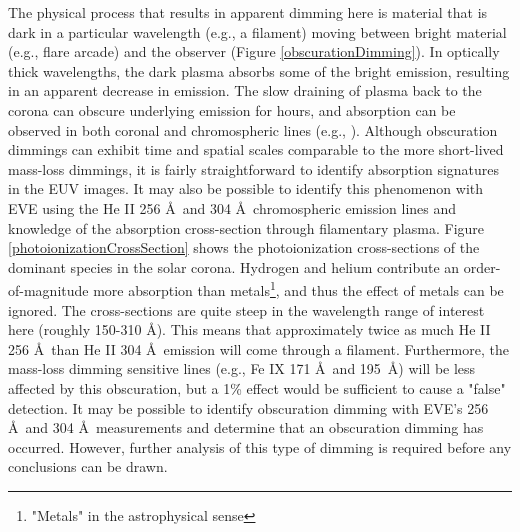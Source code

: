 The physical process that results in apparent dimming here is material that is dark in a particular wavelength (e.g., a filament) moving between bright material (e.g., flare arcade) and the observer (Figure \ref{obscurationDimming}). In optically thick wavelengths, the dark plasma absorbs some of the bright emission, resulting in an apparent decrease in emission. The slow draining of plasma back to the corona can obscure underlying emission for hours, and absorption can be observed in both coronal and chromospheric lines (e.g., \citealt{Gilbert2013}). Although obscuration dimmings can exhibit time and spatial scales comparable to the more short-lived mass-loss dimmings, it is fairly straightforward to identify absorption signatures in the EUV images. It may also be possible to identify this phenomenon with EVE using the He II 256 \AA\ and 304 \AA\ chromospheric emission lines and knowledge of the absorption cross-section through filamentary plasma. Figure \ref{photoionizationCrossSection} shows the photoionization cross-sections of the dominant species in the solar corona. Hydrogen and helium contribute an order-of-magnitude more absorption than metals\footnote{"Metals" in the astrophysical sense}, and thus the effect of metals can be ignored. The cross-sections are quite steep in the wavelength range of interest here (roughly 150-310 \AA). This means that approximately twice as much He II 256 \AA\ than He II 304 \AA\ emission will come through a filament. Furthermore, the mass-loss dimming sensitive lines (e.g., Fe IX 171 \AA\ and 195 \AA) will be less affected by this obscuration, but a 1\% effect would be sufficient to cause a "false" detection. It may be possible to identify obscuration dimming with EVE's 256 \AA\ and 304 \AA\ measurements and determine that an obscuration dimming has occurred. However, further analysis of this type of dimming is required before any conclusions can be drawn. 

